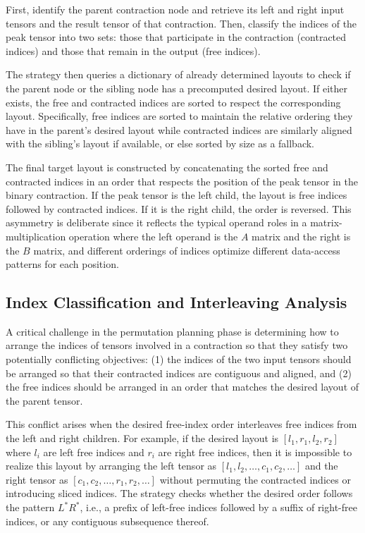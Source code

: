 First, identify the parent contraction node and retrieve its left and right input tensors and the result tensor of that contraction. Then, classify the indices of the peak tensor into two sets: those that participate in the contraction (contracted indices) and those that remain in the output (free indices).

The strategy then queries a dictionary of already determined layouts to check if the parent node or the sibling node has a precomputed desired layout. If either exists, the free and contracted indices are sorted to respect the corresponding layout. Specifically, free indices are sorted to maintain the relative ordering they have in the parent's desired layout while contracted indices are similarly aligned with the sibling's layout if available, or else sorted by size as a fallback.

The final target layout is constructed by concatenating the sorted free and contracted indices in an order that respects the position of the peak tensor in the binary contraction. If the peak tensor is the left child, the layout is free indices followed by contracted indices. If it is the right child, the order is reversed. This asymmetry is deliberate since it reflects the typical operand roles in a matrix-multiplication operation where the left operand is the $A$ matrix and the right is the $B$ matrix, and different orderings of indices optimize different data-access patterns for each position.

\subsection{Index Classification and Interleaving Analysis}

A critical challenge in the permutation planning phase is determining how to arrange the indices of tensors involved in a contraction so that they satisfy two potentially conflicting objectives: (1) the indices of the two input tensors should be arranged so that their contracted indices are contiguous and aligned, and (2) the free indices should be arranged in an order that matches the desired layout of the parent tensor.

This conflict arises when the desired free-index order interleaves free indices from the left and right children. For example, if the desired layout is $[l_1, r_1, l_2, r_2]$ where $l_i$ are left free indices and $r_i$ are right free indices, then it is impossible to realize this layout by arranging the left tensor as $[l_1, l_2, \ldots, c_1, c_2, \ldots]$ and the right tensor as $[c_1, c_2, \ldots, r_1, r_2, \ldots]$ without permuting the contracted indices or introducing sliced indices. The strategy checks whether the desired order follows the pattern $L^* R^*$, i.e., a prefix of left-free indices followed by a suffix of right-free indices, or any contiguous subsequence thereof. 
